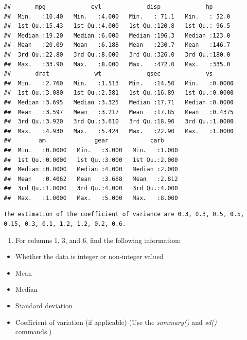\documentclass[
]{article}
\providecommand{\tightlist}{%
  \setlength{\itemsep}{0pt}\setlength{\parskip}{0pt}}
\begin{document}
\begin{verbatim}
##       mpg             cyl             disp             hp       
##  Min.   :10.40   Min.   :4.000   Min.   : 71.1   Min.   : 52.0  
##  1st Qu.:15.43   1st Qu.:4.000   1st Qu.:120.8   1st Qu.: 96.5  
##  Median :19.20   Median :6.000   Median :196.3   Median :123.0  
##  Mean   :20.09   Mean   :6.188   Mean   :230.7   Mean   :146.7  
##  3rd Qu.:22.80   3rd Qu.:8.000   3rd Qu.:326.0   3rd Qu.:180.0  
##  Max.   :33.90   Max.   :8.000   Max.   :472.0   Max.   :335.0  
##       drat             wt             qsec             vs        
##  Min.   :2.760   Min.   :1.513   Min.   :14.50   Min.   :0.0000  
##  1st Qu.:3.080   1st Qu.:2.581   1st Qu.:16.89   1st Qu.:0.0000  
##  Median :3.695   Median :3.325   Median :17.71   Median :0.0000  
##  Mean   :3.597   Mean   :3.217   Mean   :17.85   Mean   :0.4375  
##  3rd Qu.:3.920   3rd Qu.:3.610   3rd Qu.:18.90   3rd Qu.:1.0000  
##  Max.   :4.930   Max.   :5.424   Max.   :22.90   Max.   :1.0000  
##        am              gear            carb      
##  Min.   :0.0000   Min.   :3.000   Min.   :1.000  
##  1st Qu.:0.0000   1st Qu.:3.000   1st Qu.:2.000  
##  Median :0.0000   Median :4.000   Median :2.000  
##  Mean   :0.4062   Mean   :3.688   Mean   :2.812  
##  3rd Qu.:1.0000   3rd Qu.:4.000   3rd Qu.:4.000  
##  Max.   :1.0000   Max.   :5.000   Max.   :8.000
\end{verbatim}

\begin{verbatim}
The estimation of the coefficient of variance are 0.3, 0.3, 0.5, 0.5, 0.15, 0.3, 0.1, 1.2, 1.2, 0.2, 0.6.
\end{verbatim}

\begin{enumerate}
\def\labelenumi{\arabic{enumi}.}
\setcounter{enumi}{2}
\tightlist
\item
  For columns 1, 3, and 6, find the following information:
\end{enumerate}

\begin{itemize}
\tightlist
\item
  Whether the data is integer or non-integer valued
\item
  Mean
\item
  Median
\item
  Standard deviation
\item
  Coefficient of variation (if applicable) (Use the \emph{summary()} and
  \emph{sd()} commands.)
\end{itemize}
\end{document}
